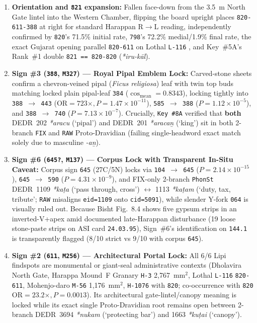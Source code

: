 \documentclass[11pt,a4paper]{article}
\begin{document}
\begin{enumerate}
  \item \textbf{Orientation and \texttt{821} expansion:} Fallen face-down from the 3.5~m North Gate lintel into the Western Chamber, flipping the board upright places \texttt{820-611-388} at right for standard Harappan R$\to$L reading, independently confirmed by \texttt{820}'s 71.5\% initial rate, \texttt{798}'s 72.2\% medial/1.9\% final rate, the exact Gujarat opening parallel \texttt{820-611} on Lothal \texttt{L-116} \citep{rao1979lothal}, and Key~\#5A's Rank~\#1 double \texttt{821 == 820-820} (\textit{*iru-kāl}).
  \item \textbf{Sign \#3 (\texttt{388}, \texttt{M327}) — Royal Pipal Emblem Lock:} Carved-stone sheets confirm a chevron-veined pipal (\textit{Ficus religiosa}) leaf with twin top buds matching locked plain pipal-leaf \texttt{384} ($\cos_{\text{mean}} = 0.8343$), locking tightly into \texttt{388 $\to$ 443} ($\text{OR} = 723\times, P = 1.47 \times 10^{-11}$), \texttt{585 $\to$ 388} ($P = 1.12 \times 10^{-5}$), and \texttt{388 $\to$ 740} ($P = 7.13 \times 10^{-7}$). Crucially, \texttt{Key \#8A} verified that \textbf{both} DEDR~202 \textit{*aracu} (`pipal') and DEDR~201 \textit{*aracaṉ} (`king') sit in both 2-branch \texttt{FIX} and \texttt{RAW} Proto-Dravidian (failing single-headword exact match solely due to masculine \textit{-aṉ}).
  \item \textbf{Sign \#6 (\texttt{645?}, \texttt{M137}) — Corpus Lock with Transparent In-Situ Caveat:} Corpus sign \texttt{645} (27C/5N) locks via \texttt{104 $\to$ 645} ($P = 2.14 \times 10^{-15}$), \texttt{645 $\to$ 590} ($P = 4.31 \times 10^{-9}$), and FIX-only 2-branch \texttt{PhonSt} DEDR~1109 \textit{*kaṭa} (`pass through, cross') $\leftrightarrow$ 1113 \textit{*kaṭam} (`duty, tax, tribute'; \texttt{RAW} misaligns \texttt{eid=1109} onto \texttt{cid=5091}), while slender Y-fork \texttt{064} is visually ruled out. Because Bisht Fig.~8.4 shows five gypsum strips in an inverted-V+apex amid documented late-Harappan disturbance (19 loose stone-paste strips on ASI card \texttt{24.03.95}), Sign~\#6's identification on \texttt{144.1} is transparently flagged (8/10 strict vs 9/10 with corpus \texttt{645}).
  \item \textbf{Sign \#2 (\texttt{611}, \texttt{M256}) — Architectural Portal Lock:} All 6/6 Lipi findspots are monumental or giant-seal administrative contexts (Dholavira North Gate, Harappa Mound~F Granary \texttt{H-3} 2,767~mm$^2$, Lothal \texttt{L-116} \texttt{820-611}, Mohenjo-daro \texttt{M-56} 1,176~mm$^2$, \texttt{H-1076} with \texttt{820}; co-occurrence with \texttt{820} $\text{OR} = 23.2\times, P = 0.0013$). Its architectural gate-lintel/canopy meaning is locked while its exact single Proto-Dravidian root remains open between 2-branch DEDR~3694 \textit{*nukam} (`protecting bar') and 1663 \textit{*kuṭai} (`canopy').
\end{enumerate}
\end{document}
